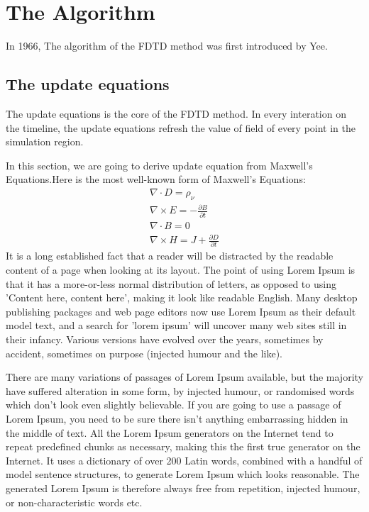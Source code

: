 \section{The Algorithm}

In 1966, The algorithm of the FDTD method was first introduced by Yee.

\subsection{The update equations}

The update equations is the core of the FDTD method. In every interation on the timeline, the update equations refresh
the value of field of every point in the simulation region.

In this section, we are going to derive update equation from Maxwell's Equations.Here is the most well-known form of
Maxwell's Equations:
\begin{gather}
  \nabla \cdot D = \rho_{\nu}\\
  \nabla \times E = -\frac{\partial B}{\partial t}\\
  \nabla \cdot B = 0\\
  \nabla \times H = J + \frac{\partial D}{\partial t}
\end{gather}
It is a long established fact that a reader will be distracted by the readable content of a page when looking at its
layout. The point of using Lorem Ipsum is that it has a more-or-less normal distribution of letters, as opposed to using
'Content here, content here', making it look like readable English. Many desktop publishing packages and web page
editors now use Lorem Ipsum as their default model text, and a search for 'lorem ipsum' will uncover many web sites
still in their infancy. Various versions have evolved over the years, sometimes by accident, sometimes on purpose
(injected humour and the like).

There are many variations of passages of Lorem Ipsum available, but the majority have suffered alteration in some form,
by injected humour, or randomised words which don't look even slightly believable. If you are going to use a passage of
Lorem Ipsum, you need to be sure there isn't anything embarrassing hidden in the middle of text. All the Lorem Ipsum
generators on the Internet tend to repeat predefined chunks as necessary, making this the first true generator on the
Internet. It uses a dictionary of over 200 Latin words, combined with a handful of model sentence structures, to
generate Lorem Ipsum which looks reasonable. The generated Lorem Ipsum is therefore always free from repetition,
injected humour, or non-characteristic words etc.




